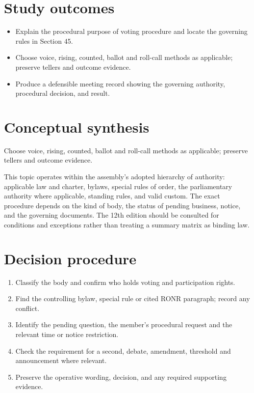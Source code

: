 \documentclass[11pt]{article}
\begin{document}
\SuiteOpen
{}
\section{Study outcomes}
\begin{itemize}[leftmargin=*,itemsep=4pt]
\item Explain the procedural purpose of voting procedure and locate the governing rules in Section 45.
\item Choose voice, rising, counted, ballot and roll-call methods as applicable; preserve tellers and outcome evidence.
\item Produce a defensible meeting record showing the governing authority, procedural decision, and result.
\end{itemize}

\section{Conceptual synthesis}
Choose voice, rising, counted, ballot and roll-call methods as applicable; preserve tellers and outcome evidence.

This topic operates within the assembly’s adopted hierarchy of authority: applicable law and charter, bylaws, special rules of order, the parliamentary authority where applicable, standing rules, and valid custom. The exact procedure depends on the kind of body, the status of pending business, notice, and the governing documents. The 12th edition should be consulted for conditions and exceptions rather than treating a summary matrix as binding law.
\section{Decision procedure}
\begin{enumerate}[leftmargin=*,itemsep=4pt]
\item Classify the body and confirm who holds voting and participation rights.
\item Find the controlling bylaw, special rule or cited RONR paragraph; record any conflict.
\item Identify the pending question, the member’s procedural request and the relevant time or notice restriction.
\item Check the requirement for a second, debate, amendment, threshold and announcement where relevant.
\item Preserve the operative wording, decision, and any required supporting evidence.
\end{enumerate}
\end{document}

